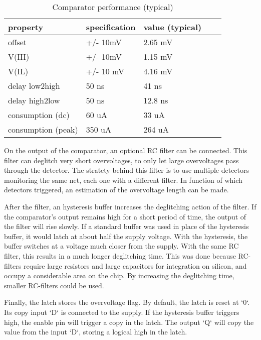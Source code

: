 \begin{table}[!htbp]
\centering
\begin{tabular}{@{}lllll@{}}
\toprule
property           & specification & value (typical) \\
\midrule
offset             & +/- 10mV      & 2.65 mV \\
V(IH)              & +/- 10mV      & 1.15 mV \\
V(IL)              & +/- 10 mV     & 4.16 mV \\
delay low2high     & 50 ns         & 41 ns   \\
delay high2low     & 50 ns         & 12.8 ns \\
consumption (dc)   & 60 uA         & 33 uA \\
consumption (peak) & 350 uA        & 264 uA \\
\bottomrule
\end{tabular}
\caption{Comparator performance (typical)}
\label{tab:comparator-performance}
\end{table}


On the output of the comparator, an optional RC filter can be connected.
This filter can deglitch very short overvoltages, to only let large overvoltages pass through the detector.
The stratety behind this filter is to use multiple detectors monitoring the same net, each one with a different filter.
In function of which detectors triggered, an estimation of the overvoltage length can be made.

After the filter, an hysteresis buffer increases the deglitching action of the filter.
If the comparator's output remains high for a short period of time, the output of the filter will rise slowly.
If a standard buffer was used in place of the hysteresis buffer, it would latch at about half the supply voltage.
With the hysteresis, the buffer switches at a voltage much closer from the supply.
With the same RC filter, this results in a much longer deglitching time.
This was done because RC-filters require large resistors and large capacitors for integration on silicon, and occupy a considerable area on the chip.
By increasing the deglitching time, smaller RC-filters could be used.

Finally, the latch stores the overvoltage flag.
By default, the latch is reset at `0`.
Its copy input `D` is connected to the supply.
If the hysteresis buffer triggers high, the enable pin will trigger a copy in the latch.
The output `Q` will copy the value from the input `D`, storing a logical high in the latch.


